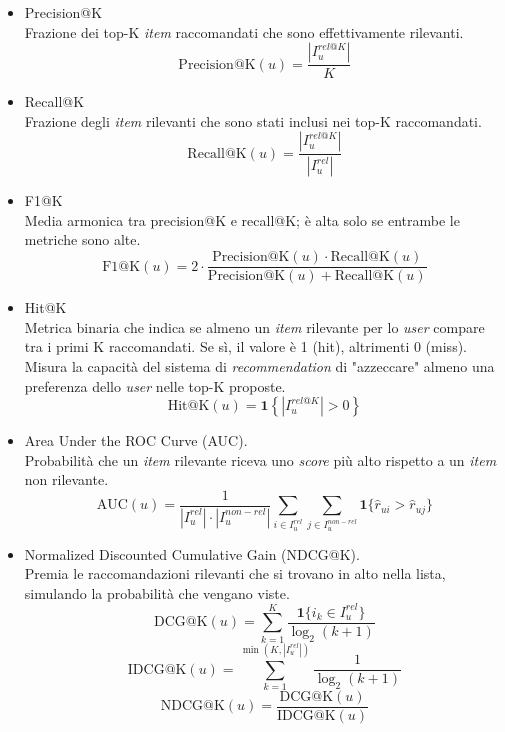 \begin{itemize}
    \item Precision@K\\
    Frazione dei top-K \textit{item} raccomandati che sono effettivamente rilevanti.
    \[
    \text{Precision@K}(u) = \frac{|I_u^{rel@K}|}{K}
    \]
    
    \item Recall@K\\
    Frazione degli \textit{item} rilevanti che sono stati inclusi nei top-K raccomandati.
    \[
    \text{Recall@K}(u) = \frac{|I_u^{rel@K}|}{|I_u^{rel}|}
    \]
    
    \item F1@K\\
    Media armonica tra precision@K e recall@K; è alta solo se entrambe le metriche sono alte.
    \[
    \text{F1@K}(u) = 2 \cdot \frac{\text{Precision@K}(u) \cdot \text{Recall@K}(u)}{\text{Precision@K}(u) + \text{Recall@K}(u)}
    \]
    \item Hit@K\\
    Metrica binaria che indica se almeno un \textit{item} rilevante per lo \textit{user} compare tra i primi K raccomandati. Se sì, il valore è 1 (hit), altrimenti 0 (miss). Misura la capacità del sistema di \textit{recommendation} di "azzeccare" almeno una preferenza dello \textit{user} nelle top-K proposte.\\
    \[
    \text{Hit@K}(u) = \mathbf{1}\left\{ |I_u^{rel@K}| > 0 \right\}
    \]  
    
    \item Area Under the ROC Curve (AUC).\\
    Probabilità che un \textit{item} rilevante riceva uno \textit{score} più alto rispetto a un \textit{item} non rilevante.
    \[
    \text{AUC}(u) = \frac{1}{|I_u^{rel}| \cdot |I_u^{non-rel}|} \sum_{i \in I_u^{rel}} \sum_{j \in I_u^{non-rel}} \mathbf{1}\{\hat{r}_{ui} > \hat{r}_{uj}\}
    \]
    
    \item Normalized Discounted Cumulative Gain (NDCG@K).\\
    Premia le raccomandazioni rilevanti che si trovano in alto nella lista, simulando la probabilità che vengano viste.
    \[
    \text{DCG@K}(u) = \sum_{k=1}^{K} \frac{\mathbf{1}\{i_k \in I_u^{rel}\}}{\log_2(k + 1)}
    \]
    \[
    \text{IDCG@K}(u) = \sum_{k=1}^{\min(K, |I_u^{rel}|)} \frac{1}{\log_2(k + 1)}
    \]
    \[
    \text{NDCG@K}(u) = \frac{\text{DCG@K}(u)}{\text{IDCG@K}(u)}
    \]
\end{itemize}